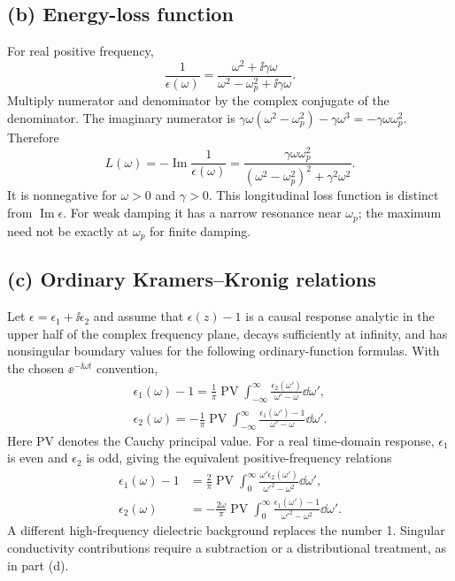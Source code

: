 \subsection*{(b) Energy-loss function}
For real positive frequency,
\[
\frac1{\epsilon(\omega)}
=\frac{\omega^2+\ii\gamma\omega}
{\omega^2-\omega_p^2+\ii\gamma\omega}.
\]
Multiply numerator and denominator by the complex conjugate of the denominator. The imaginary numerator is
$\gamma\omega(\omega^2-\omega_p^2)-\gamma\omega^3
=-\gamma\omega\omega_p^2$. Therefore
\[
\boxed{L(\omega)=-\operatorname{Im}\frac1{\epsilon(\omega)}
=\frac{\gamma\omega\omega_p^2}
{(\omega^2-\omega_p^2)^2+\gamma^2\omega^2}.}
\]
It is nonnegative for $\omega>0$ and $\gamma>0$. This longitudinal loss function is distinct from $\operatorname{Im}\epsilon$. For weak damping it has a narrow resonance near $\omega_p$; the maximum need not be exactly at $\omega_p$ for finite damping.

\subsection*{(c) Ordinary Kramers--Kronig relations}
Let $\epsilon=\epsilon_1+\ii\epsilon_2$ and assume that $\epsilon(z)-1$ is a causal response analytic in the upper half of the complex frequency plane, decays sufficiently at infinity, and has nonsingular boundary values for the following ordinary-function formulas. With the chosen $\ee^{-\ii\omega t}$ convention,
\begin{align*}
\boxed{\epsilon_1(\omega)-1
=\frac1\pi\operatorname{PV}\int_{-\infty}^{\infty}
\frac{\epsilon_2(\omega')}{\omega'-\omega}\dd\omega',}\\
\boxed{\epsilon_2(\omega)
=-\frac1\pi\operatorname{PV}\int_{-\infty}^{\infty}
\frac{\epsilon_1(\omega')-1}{\omega'-\omega}\dd\omega'.}
\end{align*}
Here PV denotes the Cauchy principal value. For a real time-domain response, $\epsilon_1$ is even and $\epsilon_2$ is odd, giving the equivalent positive-frequency relations
\begin{align*}
\epsilon_1(\omega)-1
&=\frac2\pi\operatorname{PV}\int_0^\infty
\frac{\omega'\epsilon_2(\omega')}{\omega'^2-\omega^2}\dd\omega',\\
\epsilon_2(\omega)
&=-\frac{2\omega}{\pi}\operatorname{PV}\int_0^\infty
\frac{\epsilon_1(\omega')-1}{\omega'^2-\omega^2}\dd\omega'.
\end{align*}
A different high-frequency dielectric background replaces the number 1. Singular conductivity contributions require a subtraction or a distributional treatment, as in part (d).

